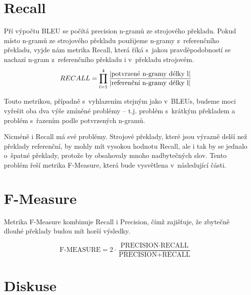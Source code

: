 \section{Recall}
Pří výpočtu BLEU se počítá precision \mbox{n-gramů} ze strojového překladu.
Pokud místo \mbox{n-gramů} ze strojového překladu použijeme \mbox{n-gramy} z~referenčního překladu,
  vyjde nám metrika Recall,
  která říká s~jakou pravděpodobností se nachazí \mbox{n-gram} z~referenčního překladu i v~překladu strojovém.
$$ RECALL = \prod_{l=1}^{4} \frac{ \lvert \text{potvrzené \mbox{n-gramy} délky l} \rvert }{ \lvert \text{referenční \mbox{n-gramy} délky l} \rvert } $$

Touto metrikou, případně s~vyhlazením stejným jako v~BLEUs,
  budeme moci vyřešit oba dva výše zmíněné problémy -- 
  t.j. problém s~krátkým překladem a problém s~řazením podle potvrzených \mbox{n-gramů}.

Nicméně i Recall má své problémy.
Strojové překlady,
  které jsou výrazně delší než překlady referenční,
  by mohly mít vysokou hodnotu Recall,
  ale i tak by se jednalo o~špatné překlady,
  protože by obsahovaly mnoho nadbytečných slov. 
Tento problém řeší metrika F-Measure,
  která bude vysvětlena v~následující části.

\section{F-Measure}
Metrika F-Measure kombinuje Recall i Precision,
  čímž zajišťuje, 
  že zbytečně dlouhé překlady budou mít horší výsledky.

$$ \text{F-MEASURE} = 2 \cdot \frac{\text{PRECISION} \cdot \text{RECALL}}{\text{PRECISION} + \text{RECALL}} $$

\section{Diskuse}
